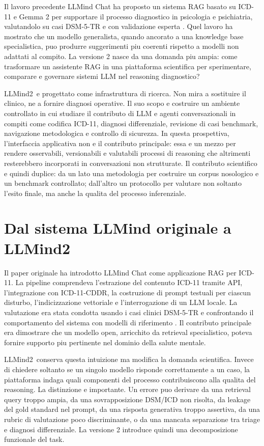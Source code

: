 \documentclass[11pt,a4paper]{article}
\newcommand{\llmind}{LLMind2}
\begin{document}
Il lavoro precedente LLMind Chat ha proposto un sistema RAG basato su ICD-11 e Gemma 2 per supportare il processo diagnostico in psicologia e psichiatria, valutandolo su casi DSM-5-TR e con validazione esperta \citep{cremaschi2025decoding}. Quel lavoro ha mostrato che un modello generalista, quando ancorato a una knowledge base specialistica, puo produrre suggerimenti piu coerenti rispetto a modelli non adattati al compito. La versione 2 nasce da una domanda piu ampia: come trasformare un assistente RAG in una piattaforma scientifica per sperimentare, comparare e governare sistemi LLM nel reasoning diagnostico?

\llmind\ e progettato come infrastruttura di ricerca. Non mira a sostituire il clinico, ne a fornire diagnosi operative. Il suo scopo e costruire un ambiente controllato in cui studiare il contributo di LLM e agenti conversazionali in compiti come codifica ICD-11, diagnosi differenziale, revisione di casi benchmark, navigazione metodologica e controllo di sicurezza. In questa prospettiva, l'interfaccia applicativa non e il contributo principale: essa e un mezzo per rendere osservabili, versionabili e valutabili processi di reasoning che altrimenti resterebbero incorporati in conversazioni non strutturate. Il contributo scientifico e quindi duplice: da un lato una metodologia per costruire un corpus nosologico e un benchmark controllato; dall'altro un protocollo per valutare non soltanto l'esito finale, ma anche la qualita del processo inferenziale.

\section{Dal sistema LLMind originale a \llmind}
Il paper originale ha introdotto LLMind Chat come applicazione RAG per ICD-11. La pipeline comprendeva l'estrazione del contenuto ICD-11 tramite API, l'integrazione con ICD-11-CDDR, la costruzione di prompt testuali per ciascun disturbo, l'indicizzazione vettoriale e l'interrogazione di un LLM locale. La valutazione era stata condotta usando i casi clinici DSM-5-TR e confrontando il comportamento del sistema con modelli di riferimento \citep{cremaschi2025decoding}. Il contributo principale era dimostrare che un modello open, arricchito da retrieval specialistico, poteva fornire supporto piu pertinente nel dominio della salute mentale.

\llmind\ conserva questa intuizione ma modifica la domanda scientifica. Invece di chiedere soltanto se un singolo modello risponde correttamente a un caso, la piattaforma indaga quali componenti del processo contribuiscono alla qualita del reasoning. La distinzione e importante. Un errore puo derivare da una retrieval query troppo ampia, da una sovrapposizione DSM/ICD non risolta, da leakage del gold standard nel prompt, da una risposta generativa troppo assertiva, da una rubric di valutazione poco discriminante, o da una mancata separazione tra triage e diagnosi differenziale. La versione 2 introduce quindi una decomposizione funzionale del task.
\end{document}

